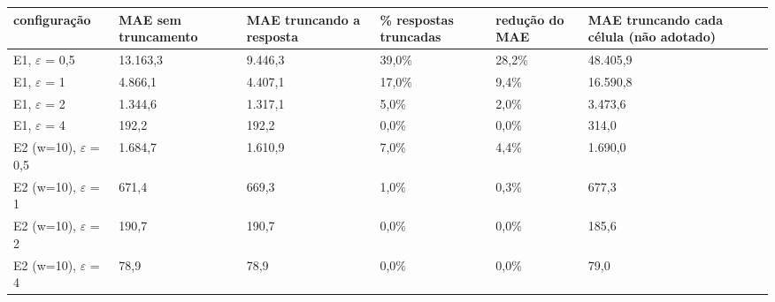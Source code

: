 \begin{tabular}{llllll}
\toprule
configuração & MAE sem truncamento & MAE truncando a resposta & \% respostas truncadas & redução do MAE & MAE truncando cada célula (não adotado) \\
\midrule
E1, $\varepsilon$ = 0,5 & 13.163,3 & 9.446,3 & 39,0\% & 28,2\% & 48.405,9 \\
E1, $\varepsilon$ = 1 & 4.866,1 & 4.407,1 & 17,0\% & 9,4\% & 16.590,8 \\
E1, $\varepsilon$ = 2 & 1.344,6 & 1.317,1 & 5,0\% & 2,0\% & 3.473,6 \\
E1, $\varepsilon$ = 4 & 192,2 & 192,2 & 0,0\% & 0,0\% & 314,0 \\
E2 (w=10), $\varepsilon$ = 0,5 & 1.684,7 & 1.610,9 & 7,0\% & 4,4\% & 1.690,0 \\
E2 (w=10), $\varepsilon$ = 1 & 671,4 & 669,3 & 1,0\% & 0,3\% & 677,3 \\
E2 (w=10), $\varepsilon$ = 2 & 190,7 & 190,7 & 0,0\% & 0,0\% & 185,6 \\
E2 (w=10), $\varepsilon$ = 4 & 78,9 & 78,9 & 0,0\% & 0,0\% & 79,0 \\
\bottomrule
\end{tabular}
